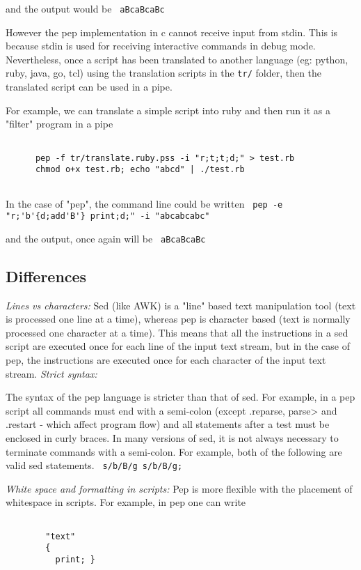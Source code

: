 \documentclass[a4paper,12pt]{article}
\begin{document}
    and the output would be 
 \verb| aBcaBcaBc |


    However the pep implementation in c cannot receive input from stdin. This
    is because stdin is used for receiving interactive commands in debug mode.
    Nevertheless, once a script has been translated to another language (eg:
    python, ruby, java, go, tcl) using the translation scripts in the \texttt{tr/}
    folder, then the translated script can be used in a pipe.
    
    For example, we can translate a simple script into ruby and then
    run it as a "filter" program in a pipe 
 \begin{lstlisting}[breaklines] 

      pep -f tr/translate.ruby.pss -i "r;t;t;d;" > test.rb
      chmod o+x test.rb; echo "abcd" | ./test.rb
    
 \end{lstlisting} 


    In the case of "pep", the command line could be written 
 \verb| pep -e "r;'b'{d;add'B'} print;d;" -i "abcabcabc" |


    and the output, once again will be 
 \verb| aBcaBcaBc |


\subsection{Differences}
 \emph{ Lines vs characters: }
     Sed (like AWK) is a "line" based text manipulation tool (text is processed
     one line at a time), whereas pep is character based (text is normally
     processed one character at a time). This means that all the instructions
     in a sed script are executed once for each line of the input text stream,
     but in the case of pep, the instructions are executed once for each
     character of the input text stream.
 \emph{ Strict syntax: }

     The syntax of the pep language is stricter than that of sed. For example,
     in a pep script all commands must end with a semi-colon (except .reparse,
     parse> and .restart - which affect program flow) and all statements after
     a test must be enclosed in curly braces. In many versions of sed, it is
     not always necessary to terminate commands with a semi-colon. For example,
     both of the following are valid sed statements. 
 \verb| s/b/B/g s/b/B/g; |

 \emph{ White space and formatting in scripts: }
      Pep is more flexible with the placement of whitespace in
      scripts. For example, in pep one can write 
 \begin{lstlisting}[breaklines] 

        "text" 
        { 
          print; }
      
 \end{lstlisting} 
\end{document}
